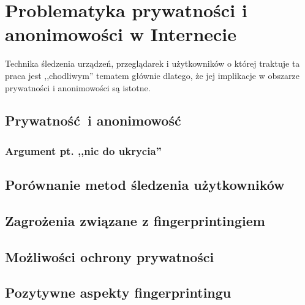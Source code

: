 \chapter{Problematyka prywatności i anonimowości w Internecie}
Technika śledzenia urządzeń, przeglądarek i użytkowników o której traktuje ta
praca jest ,,chodliwym'' tematem głównie dlatego, że jej implikacje w obszarze
prywatności i anonimowości są istotne.

\section{Prywatność i anonimowość}

\subsection{Argument pt. ,,nic do ukrycia''}

\section{Porównanie metod śledzenia użytkowników}

\section{Zagrożenia związane z fingerprintingiem}

\section{Możliwości ochrony prywatności}

\section{Pozytywne aspekty fingerprintingu}

